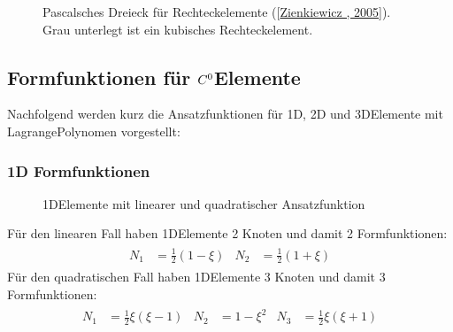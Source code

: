 \documentclass[letterpaper,10pt,german]{jupyterBook}
\let\sphinxpxdimen\pdfpxdimen\else\newdimen\sphinxpxdimen
\begin{document}
\begin{figure}[htbp]
\centering
\capstart

\noindent{}
\caption{Pascalsches Dreieck für Rechteckelemente ({[}\hyperlink{cite.quellen:id3}{Zienkiewicz , 2005}{]}). Grau unterlegt ist ein kubisches Rechteckelement.}\label{\detokenize{chapters/chapter3/Ansatzfunktionen:pascalquad}}\end{figure}


\subsection{Formfunktionen für \protect\(C^0\protect\)\sphinxhyphen{}Elemente}
\label{\detokenize{chapters/chapter3/Ansatzfunktionen:formfunktionen-fur-c-0-elemente}}
\sphinxAtStartPar
Nachfolgend werden kurz die Ansatzfunktionen für 1D\sphinxhyphen{}, 2D\sphinxhyphen{} und 3D\sphinxhyphen{}Elemente mit Lagrange\sphinxhyphen{}Polynomen vorgestellt:


\subsubsection{1D Formfunktionen}
\label{\detokenize{chapters/chapter3/Ansatzfunktionen:d-formfunktionen}}
\begin{figure}[htbp]
\centering
\capstart

\noindent\sphinxincludegraphics[width=500\sphinxpxdimen]{{Line-Elements}.png}
\caption{1D\sphinxhyphen{}Elemente mit linearer und quadratischer Ansatzfunktion}\label{\detokenize{chapters/chapter3/Ansatzfunktionen:linearelements}}\end{figure}

\sphinxAtStartPar
Für den linearen Fall haben 1D\sphinxhyphen{}Elemente 2 Knoten und damit 2 Formfunktionen:
\begin{equation}\label{equation:chapters/chapter3/Ansatzfunktionen:1D_Formfunktionen}
\begin{split}\begin{align}
N_1 &= \frac{1}{2} (1 - \xi) & N_2 &= \frac{1}{2} (1 + \xi)
\end{align}\end{split}
\end{equation}
\sphinxAtStartPar
Für den quadratischen Fall haben 1D\sphinxhyphen{}Elemente 3 Knoten und damit 3 Formfunktionen:
\begin{equation}\label{equation:chapters/chapter3/Ansatzfunktionen:1D_Formfunktionen_quad}
\begin{split}\begin{align}
N_1 &= \frac{1}{2} \xi (\xi - 1) & N_2 &= 1 - \xi^2 & N_3 &= \frac{1}{2} \xi (\xi + 1)
\end{align}\end{split}
\end{equation}
\end{document}
